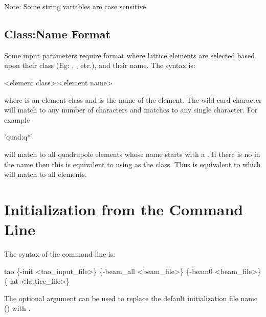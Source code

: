 Note: Some string variables are case sensitive.

\subsection{Class:Name Format}
\label{s:class:name}

Some input parameters require  format where lattice
elements are selected based upon their class (Eg: ,
, etc.), and their name. The syntax is:
\begin{example}
  <element class>:<element name>
\end{example}
where  is an element class and 
is the name of the element.  The wild-card character  will match
to any number of characters and  matches to any
single character.  For example
\begin{example}
  'quad:q*'
\end{example}
will match to all quadrupole elements whose name starts with a
. If there is no  in the name then this is equivalent
to using  as the class.  Thus  is equivalent to
 which will match to all elements.

\section{Initialization from the Command Line}
\label{s:command.line} 

The syntax of the command line is:
\begin{example}
  tao \{-init <tao_input_file>\} \{-beam_all <beam_file>\} 
                          \{-beam0 <beam_file>\} \{-lat <lattice_file>\}
\end{example}

The  optional argument can be used to replace the default
initialization file name () with .


